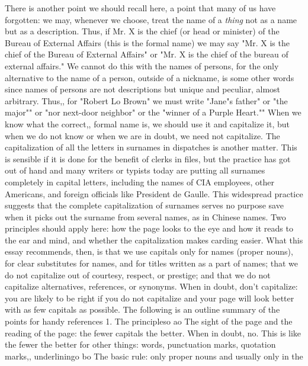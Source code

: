 \documentclass[
    oneside,
    11pt,
    draft
]{memoir}
\begin{document}
There is another point we should recall here, a point that many of us have forgotten: we may, whenever we choose, treat the name of a \emph{thing} not as a name but as a description. Thus, if Mr. X is the chief (or head or minister) of the Bureau of External Affairs (this is the formal name) we may say "Mr. X is the chief of the Bureau of External Affairs" or "Mr. X is the chief of the bureau of external affairs." We cannot do this with the names of persons, for the only alternative to the name of a person, outside of a nickname, is some other words since names of persons are not descriptions but unique and peculiar, almost arbitrary. Thus,, for "Robert Lo Brown" we must write "Jane"s father" or "the major"" or "nor next-door neighbor" or the "winner of a Purple Heart."" When we know what the correct,, formal name is, we should use it and capitalize it, but when we do not know or when we are in doubt, we need not capitalize. The capitalization of all the letters in surnames in dispatches is another matter. This is sensible if it is done for the benefit of clerks in files, but the practice has got out of hand and many writers or typists today are putting all surnames completely in capital letters, including the names of CIA employees, other Americans, and foreign officials like President de Gaulle. This widespread practice suggests that the complete capitalization of surnames serves no purpose save when it picks out the surname from several names, as in Chinese names. Two principles should apply here: how the page looks to the eye and how it reads to the ear and mind, and whether the capitalization makes carding easier. What this essay recommends, then, is that we use capitals only for names (proper nouns), for clear substitutes for names, and for titles written as a part of names; that we do not capitalize out of courtesy, respect, or prestige; and that we do not capitalize alternatives, references, or synonyms. When in doubt, don't capitalize: you are likely to be right if you do not capitalize and your page will look better with as few capitals as possible. The following is an outline summary of the points for handy references 1. The principleso ao The sight of the page and the reading of the page: the fewer capitals the better. When in doubt, no. This is like the fewer the better for other things: words, punctuation marks, quotation marks,, underliningo bo The basic rule: only proper nouns and usually only in the
\end{document}

